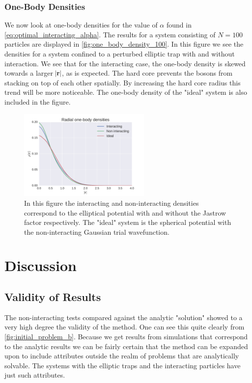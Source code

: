 \documentclass[
    a4paper, aps, twocolumn, floatfix, superscriptaddress,
    nofootinbib]{revtex4-1}
\newcommand{\vf}{\mathbf}
\newcommand{\1}{\mathds{1}}
\begin{document}
        \subsubsection{One-Body Densities}
            We now look at one-body densities for the value of $\alpha$ found in
            \autoref{eq:optimal_interacting_alpha}. The results for a system
            consisting of $N=100$ particles are displayed in
            \autoref{fig:one_body_density_100}.  In this figure we see the
            densities for a system confined to a perturbed elliptic trap with
            and without interaction. We see that for the interacting case, the
            one-body density is skewed towards a larger $\abs{\vf{r}}$, as is
            expected. The hard core prevents the bosons from stacking on top of
            each other spatially. By increasing the hard core radius this trend
            will be more noticeable. The one-body density of the "ideal" system
            is also included in the figure.


            \begin{figure}
                \includegraphics[width=244px]
                {../data/figures/problem_g_100N.pdf}
                \caption{In this figure the interacting and non-interacting
                densities correspond to the elliptical potential with and
                without the Jastrow factor respectively. The "ideal" system is
                the spherical potential with the non-interacting Gaussian trial
                wavefunction.}
                \label{fig:one_body_density_100}
            \end{figure}


\section{Discussion}

    \subsection{Validity of Results}
        The non-interacting tests compared against the analytic "solution"
        showed to a very high degree the validity of the method. One can see
        this quite clearly from \autoref{fig:initial_problem_b}. Because we get
        results from simulations that correspond to the analytic results we can
        be fairly certain that the method can be expanded upon to include
        attributes outside the realm of problems that are analytically solvable.
        The systems with the elliptic traps and the interacting particles have
        just such attributes.
\end{document}
